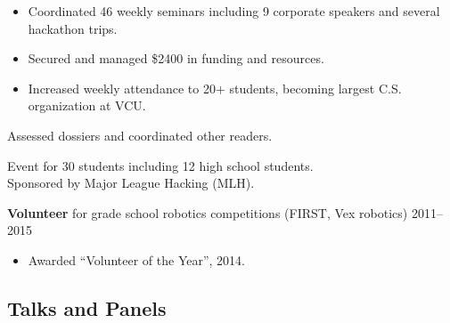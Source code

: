\documentclass[11pt,letterpaper,serif]{moderncv}
\begin{document}
{
	\begin{adjustwidth}{.25in}{}
		\begin{itemize}
			\item Coordinated 46 weekly seminars including 9 corporate speakers and several hackathon trips.
			\item Secured and managed \$2400 in funding and resources.
			\item Increased weekly attendance to 20+ students, becoming largest C.S. organization at VCU.
		\end{itemize}
	\end{adjustwidth}
}


{
	\begin{adjustwidth}{.25in}{}
		Assessed dossiers and coordinated other readers.
	\end{adjustwidth}
}


{
	\begin{adjustwidth}{.25in}{}
		Event for 30 students including 12 high school students.\\
		Sponsored by Major League Hacking (MLH).
	\end{adjustwidth}
}

{\textbf{Volunteer} for grade school robotics competitions (FIRST, Vex robotics)}
{2011--2015}{}
{
	\begin{adjustwidth}{.25in}{}
		\begin{itemize}
			\item Awarded ``Volunteer of the Year'', 2014.
		\end{itemize}
	\end{adjustwidth}
}



\subsection{Talks and Panels}
\end{document}
